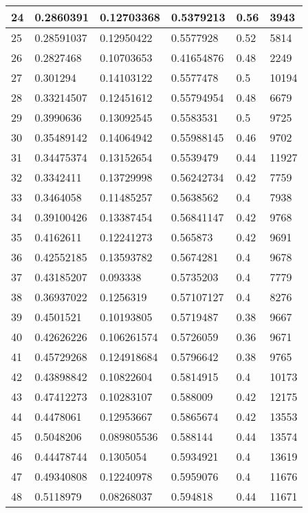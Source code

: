 \begin{longtable}{|l|l|l|l|l|l|}
24 & 0.2860391 & 0.12703368 & 0.5379213 & 0.56 & 3943 \\ \hline 
25 & 0.28591037 & 0.12950422 & 0.5577928 & 0.52 & 5814 \\ \hline 
26 & 0.2827468 & 0.10703653 & 0.41654876 & 0.48 & 2249 \\ \hline 
27 & 0.301294 & 0.14103122 & 0.5577478 & 0.5 & 10194 \\ \hline 
28 & 0.33214507 & 0.12451612 & 0.55794954 & 0.48 & 6679 \\ \hline 
29 & 0.3990636 & 0.13092545 & 0.5583531 & 0.5 & 9725 \\ \hline 
30 & 0.35489142 & 0.14064942 & 0.55988145 & 0.46 & 9702 \\ \hline 
31 & 0.34475374 & 0.13152654 & 0.5539479 & 0.44 & 11927 \\ \hline 
32 & 0.3342411 & 0.13729998 & 0.56242734 & 0.42 & 7759 \\ \hline 
33 & 0.3464058 & 0.11485257 & 0.5638562 & 0.4 & 7938 \\ \hline 
34 & 0.39100426 & 0.13387454 & 0.56841147 & 0.42 & 9768 \\ \hline 
35 & 0.4162611 & 0.12241273 & 0.565873 & 0.42 & 9691 \\ \hline 
36 & 0.42552185 & 0.13593782 & 0.5674281 & 0.4 & 9678 \\ \hline 
37 & 0.43185207 & 0.093338 & 0.5735203 & 0.4 & 7779 \\ \hline 
38 & 0.36937022 & 0.1256319 & 0.57107127 & 0.4 & 8276 \\ \hline 
39 & 0.4501521 & 0.10193805 & 0.5719487 & 0.38 & 9667 \\ \hline 
40 & 0.42626226 & 0.106261574 & 0.5726059 & 0.36 & 9671 \\ \hline 
41 & 0.45729268 & 0.124918684 & 0.5796642 & 0.38 & 9765 \\ \hline 
42 & 0.43898842 & 0.10822604 & 0.5814915 & 0.4 & 10173 \\ \hline 
43 & 0.47412273 & 0.10283107 & 0.588009 & 0.42 & 12175 \\ \hline 
44 & 0.4478061 & 0.12953667 & 0.5865674 & 0.42 & 13553 \\ \hline 
45 & 0.5048206 & 0.089805536 & 0.588144 & 0.44 & 13574 \\ \hline 
46 & 0.44478744 & 0.1305054 & 0.5934921 & 0.4 & 13619 \\ \hline 
47 & 0.49340808 & 0.12240978 & 0.5959076 & 0.4 & 11676 \\ \hline 
48 & 0.5118979 & 0.08268037 & 0.594818 & 0.44 & 11671 \\ \hline 

\end{longtable}
